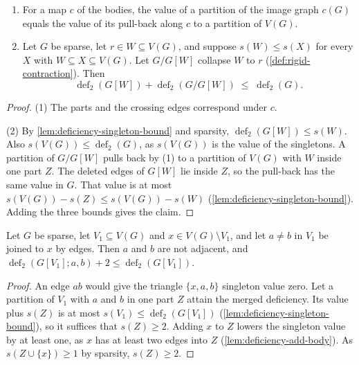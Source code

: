 \begin{lemma}
  \label{lem:deficiency-additive-core}
  \leanok
  \begin{enumerate}
    \item For a map $c$ of the bodies, the value of a partition of the
      image graph $c(G)$ equals the value of its pull-back along $c$ to
      a partition of $V(G)$.
    \item Let $G$ be sparse, let $r \in W \subseteq V(G)$, and suppose
      $s(W) \le s(X)$ for every $X$ with $W \subseteq X \subseteq V(G)$.
      Let $G/G[W]$ collapse $W$ to $r$ (\cref{def:rigid-contraction}).
      Then
      \[
        \operatorname{def}_2(G[W]) + \operatorname{def}_2(G/G[W]) \;\le\;
        \operatorname{def}_2(G).
      \]
  \end{enumerate}
\end{lemma}
\begin{proof}
  \leanok
  (1) The parts and the crossing edges correspond under $c$.

  (2) By \cref{lem:deficiency-singleton-bound} and sparsity,
  $\operatorname{def}_2(G[W]) \le s(W)$. Also $s(V(G)) \le
  \operatorname{def}_2(G)$, as $s(V(G))$ is the value of the singletons.
  A partition of $G/G[W]$ pulls back by (1) to a partition of $V(G)$
  with $W$ inside one part $Z$. The deleted edges of $G[W]$ lie inside
  $Z$, so the pull-back has the same value in $G$. That value is at most
  $s(V(G)) - s(Z) \le s(V(G)) - s(W)$
  (\cref{lem:deficiency-singleton-bound}). Adding the three bounds gives
  the claim.
\end{proof}

\begin{lemma}
  \label{lem:deficiency-one-body-chain}
  \leanok
  Let $G$ be sparse, let $V_1 \subseteq V(G)$ and $x \in V(G) \setminus
  V_1$, and let $a \neq b$ in $V_1$ be joined to $x$ by edges. Then $a$
  and $b$ are not adjacent, and $\operatorname{def}_2(G[V_1]; a, b) + 2
  \le \operatorname{def}_2(G[V_1])$.
\end{lemma}
\begin{proof}
  \leanok
  An edge $ab$ would give the triangle $\{x, a, b\}$ singleton value
  zero. Let a partition of $V_1$ with $a$ and $b$ in one part $Z$ attain
  the merged deficiency. Its value plus $s(Z)$ is at most
  $s(V_1) \le \operatorname{def}_2(G[V_1])$
  (\cref{lem:deficiency-singleton-bound}), so it suffices that
  $s(Z) \ge 2$. Adding $x$ to $Z$ lowers the singleton value by at least
  one, as $x$ has at least two edges into $Z$
  (\cref{lem:deficiency-add-body}). As $s(Z \cup \{x\}) \ge 1$ by
  sparsity, $s(Z) \ge 2$.
\end{proof}

